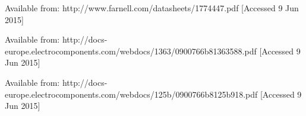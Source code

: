 \begin{thebibliography}{99}














Available from: http://www.farnell.com/datasheets/1774447.pdf [Accessed 9 Jun 2015]

Available from: http://docs-europe.electrocomponents.com/webdocs/1363/0900766b81363588.pdf [Accessed 9 Jun 2015]

Available from: http://docs-europe.electrocomponents.com/webdocs/125b/0900766b8125b918.pdf [Accessed 9 Jun 2015]

\end{thebibliography}